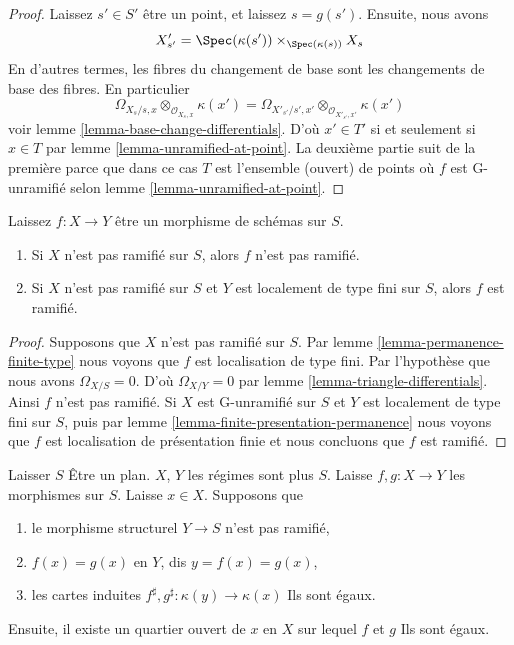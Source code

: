 \begin{proof}
Laissez $s' \in S'$ être un point, et laissez $s = g(s')$. Ensuite, nous avons $$
X'_{s'} =
\Spec(\kappa(s')) \times_{\Spec(\kappa(s))} X_s
$$ En d'autres termes, les fibres du changement de base sont les changements de base des fibres. En particulier $$
\Omega_{X_s/s, x} \otimes_{\mathcal{O}_{X_s, x}} \kappa(x')
=
\Omega_{X'_{s'}/s', x'} \otimes_{\mathcal{O}_{X'_{s'}, x'}} \kappa(x')
$$ voir lemme \ref{lemma-base-change-differentials}. D'où $x' \in T'$ si et seulement si $x \in T$ par lemme \ref{lemma-unramified-at-point}. La deuxième partie suit de la première parce que dans ce cas $T$ est l'ensemble (ouvert) de points où $f$ est G-unramifié selon lemme \ref{lemma-unramified-at-point}.
\end{proof}

\begin{lemma}

\label{lemma-unramified-permanence}
Laissez $f : X \to Y$ être un morphisme de schémas sur $S$.
\begin{enumerate}
\item Si $X$ n'est pas ramifié sur $S$, alors $f$ n'est pas ramifié.
\item Si $X$ n'est pas ramifié sur $S$ et $Y$ est localement de type fini sur $S$, alors $f$ est ramifié.
\end{enumerate}

\end{lemma}

\begin{proof}
Supposons que $X$ n'est pas ramifié sur $S$. Par lemme \ref{lemma-permanence-finite-type} nous voyons que $f$ est localisation de type fini. Par l'hypothèse que nous avons $\Omega_{X/S} = 0$. D'où $\Omega_{X/Y} = 0$ par lemme \ref{lemma-triangle-differentials}. Ainsi $f$ n'est pas ramifié. Si $X$ est G-unramifié sur $S$ et $Y$ est localement de type fini sur $S$, puis par lemme \ref{lemma-finite-presentation-permanence} nous voyons que $f$ est localisation de présentation finie et nous concluons que $f$ est ramifié.
\end{proof}

\begin{lemma}

\label{lemma-value-at-one-point}

Laisser $S$ Être un plan. $X$, $Y$ les régimes sont plus $S$. Laisse $f, g : X \to Y$ les morphismes sur $S$. Laisse $x \in X$. Supposons que

\begin{enumerate}

\item le morphisme structurel $Y \to S$ n'est pas ramifié,
\item  $f(x) = g(x)$ en $Y$, dis $y = f(x) = g(x)$,
\item les cartes induites $f^\sharp, g^\sharp : \kappa(y) \to \kappa(x)$
Ils sont égaux.

\end{enumerate}

Ensuite, il existe un quartier ouvert de $x$ en $X$ sur lequel
$f$ et $g$ Ils sont égaux.

\end{lemma}

